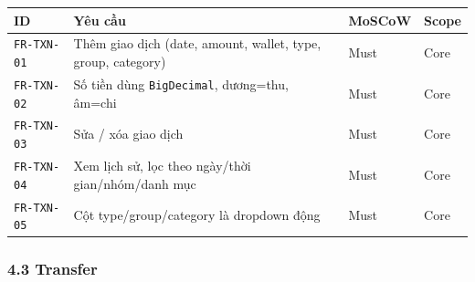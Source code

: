 \documentclass[11pt,a4paper]{article}
\newcounter{none}
\newcommand{\faintline}{\noalign{\global\arrayrulecolor{faintgray}}\hline\noalign{\global\arrayrulecolor{black}}} %
\begin{document}
{\def\LTcaptype{none}
\begin{longtable}[]{@{}
  >{\raggedright\arraybackslash}p{}
  >{\raggedright\arraybackslash}p{}
  >{\centering\arraybackslash}p{}
  >{\centering\arraybackslash}p{}@{}}
\toprule\noalign{}
\begin{minipage}[b]{\linewidth}\raggedright
ID
\end{minipage} & \begin{minipage}[b]{\linewidth}\raggedright
Yêu cầu
\end{minipage} & \begin{minipage}[b]{\linewidth}\raggedright
MoSCoW
\end{minipage} & \begin{minipage}[b]{\linewidth}\raggedright
Scope
\end{minipage} \\
\midrule\noalign{}
\endhead
\bottomrule\noalign{}
\endlastfoot
\texttt{FR-TXN-01} & Thêm giao dịch (date, amount, wallet, type, group, category) & Must & Core \\ \faintline
\texttt{FR-TXN-02} & Số tiền dùng \texttt{BigDecimal}, dương=thu, âm=chi & Must & Core \\ \faintline
\texttt{FR-TXN-03} & Sửa / xóa giao dịch & Must & Core \\ \faintline
\texttt{FR-TXN-04} & Xem lịch sử, lọc theo ngày/thời gian/nhóm/danh mục & Must & Core \\ \faintline
\texttt{FR-TXN-05} & Cột type/group/category là dropdown động & Must & Core \\
\end{longtable}
}

\subsubsection{4.3 Transfer}\label{transfer}
\end{document}
